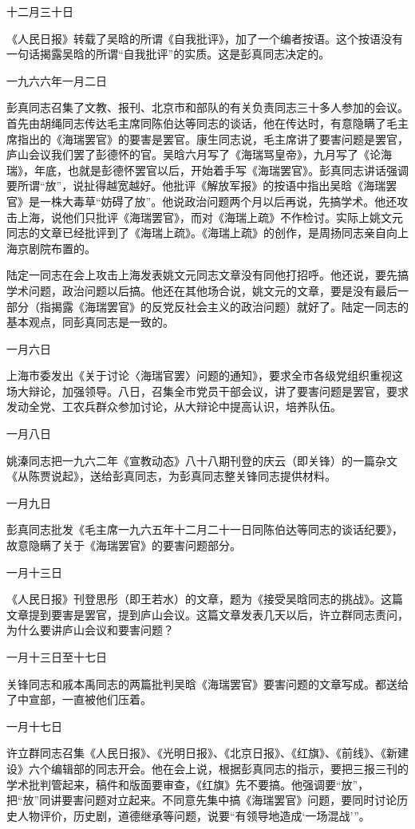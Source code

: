 \begin{maonote}
十二月三十日

《人民日报》转载了吴晗的所谓《自我批评》，加了一个编者按语。这个按语没有一句话揭露吴晗的所谓“自我批评”的实质。这是彭真同志决定的。

一九六六年一月二日

彭真同志召集了文教、报刊、北京市和部队的有关负责同志三十多人参加的会议。首先由胡绳同志传达毛主席同陈伯达等同志的谈话，他在传达时，有意隐瞒了毛主席指出的《海瑞罢官》的要害是罢官。康生同志说，毛主席讲了要害问题是罢官，庐山会议我们罢了彭德怀的官。吴晗六月写了《海瑞骂皇帝》，九月写了《论海瑞》，年底，也就是彭德怀罢官以后，开始着手写《海瑞罢官》。彭真同志讲话强调要所谓“放”，说扯得越宽越好。他批评《解放军报》的按语中指出吴晗《海瑞罢官》是一株大毒草“妨碍了放”。他说政治问题两个月以后再说，先搞学术。他还攻击上海，说他们只批评《海瑞罢官》，而对《海瑞上疏》不作检讨。实际上姚文元同志的文章已经批评到了《海瑞上疏》。《海瑞上疏》的创作，是周扬同志亲自向上海京剧院布置的。

陆定一同志在会上攻击上海发表姚文元同志文章没有同他打招呼。他还说，要先搞学术问题，政治问题以后搞。他还在其他场合说，姚文元的文章，要是没有最后一部分（指揭露《海瑞罢官》的反党反社会主义的政治问题）就好了。陆定一同志的基本观点，同彭真同志是一致的。

一月六日

上海市委发出《关于讨论〈海瑞官罢〉问题的通知》，要求全市各级党组织重视这场大辩论，加强领导。八日，召集全市党员干部会议，讲了要害问题是罢官，要求发动全党、工农兵群众参加讨论，从大辩论中提高认识，培养队伍。

一月八日

姚溱同志把一九六二年《宣教动态》八十八期刊登的庆云（即关锋）的一篇杂文《从陈贾说起》，送给彭真同志，为彭真同志整关锋同志提供材料。

一月九日

彭真同志批发《毛主席一九六五年十二月二十一日同陈伯达等同志的谈话纪要》，故意隐瞒了关于《海瑞罢官》的要害问题部分。

一月十三日

《人民日报》刊登思彤（即王若水）的文章，题为《接受吴晗同志的挑战》。这篇文章提到要害是罢官，提到庐山会议。这篇文章发表几天以后，许立群同志责问，为什么要讲庐山会议和要害问题？

一月十三日至十七日

关锋同志和戚本禹同志的两篇批判吴晗《海瑞罢官》要害问题的文章写成。都送给了中宣部，一直被他们压着。

一月十七日

许立群同志召集《人民日报》、《光明日报》、《北京日报》、《红旗》、《前线》、《新建设》六个编辑部的同志开会。他在会上说，根据彭真同志的指示，要把三报三刊的学术批判管起来，稿件和版面要审查，《红旗》先不要搞。他强调要“放”，把“放”同讲要害问题对立起来。不同意先集中搞《海瑞罢官》问题，要同时讨论历史人物评价，历史剧，道德继承等问题，说要“有领导地造成‘一场混战’”。


\end{maonote}
